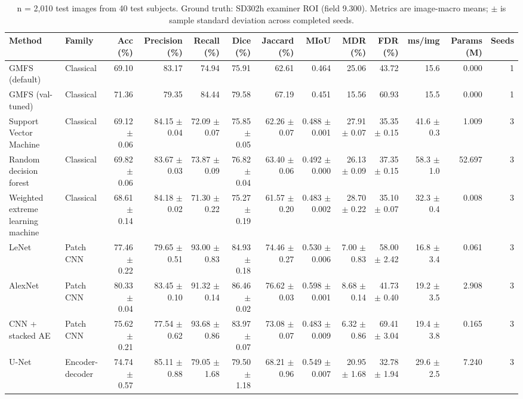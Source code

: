\begin{table}[t]
\centering
\scriptsize
\setlength{\tabcolsep}{3pt}
\caption{n = 2,010 test images from 40 test subjects. Ground truth: SD302h examiner ROI (field 9.300). Metrics are image-macro means; $\pm$ is sample standard deviation across completed seeds.}
\label{tab:sd302e-roi}
\begin{tabular}{llrrrrrrrrrrr}
\toprule
Method & Family & Acc (\%) & Precision (\%) & Recall (\%) & Dice (\%) & Jaccard (\%) & MIoU & MDR (\%) & FDR (\%) & ms/img & Params (M) & Seeds \\
\midrule
GMFS (default) & Classical & 69.10 & 83.17 & 74.94 & 75.91 & 62.61 & 0.464 & 25.06 & 43.72 & 15.6 & 0.000 & 1 \\
GMFS (val-tuned) & Classical & 71.36 & 79.35 & 84.44 & 79.58 & 67.19 & 0.451 & 15.56 & 60.93 & 15.5 & 0.000 & 1 \\
Support Vector Machine & Classical & 69.12 $\pm$ 0.06 & 84.15 $\pm$ 0.04 & 72.09 $\pm$ 0.07 & 75.85 $\pm$ 0.05 & 62.26 $\pm$ 0.07 & 0.488 $\pm$ 0.001 & 27.91 $\pm$ 0.07 & 35.35 $\pm$ 0.15 & 41.6 $\pm$ 0.3 & 1.009 & 3 \\
Random decision forest & Classical & 69.82 $\pm$ 0.06 & 83.67 $\pm$ 0.03 & 73.87 $\pm$ 0.09 & 76.82 $\pm$ 0.04 & 63.40 $\pm$ 0.06 & 0.492 $\pm$ 0.000 & 26.13 $\pm$ 0.09 & 37.35 $\pm$ 0.15 & 58.3 $\pm$ 1.0 & 52.697 & 3 \\
Weighted extreme learning machine & Classical & 68.61 $\pm$ 0.14 & 84.18 $\pm$ 0.02 & 71.30 $\pm$ 0.22 & 75.27 $\pm$ 0.19 & 61.57 $\pm$ 0.20 & 0.483 $\pm$ 0.002 & 28.70 $\pm$ 0.22 & 35.10 $\pm$ 0.07 & 32.3 $\pm$ 0.4 & 0.008 & 3 \\
LeNet & Patch CNN & 77.46 $\pm$ 0.22 & 79.65 $\pm$ 0.51 & 93.00 $\pm$ 0.83 & 84.93 $\pm$ 0.18 & 74.46 $\pm$ 0.27 & 0.530 $\pm$ 0.006 & 7.00 $\pm$ 0.83 & 58.00 $\pm$ 2.42 & 16.8 $\pm$ 3.4 & 0.061 & 3 \\
AlexNet & Patch CNN & 80.33 $\pm$ 0.04 & 83.45 $\pm$ 0.10 & 91.32 $\pm$ 0.14 & 86.46 $\pm$ 0.02 & 76.62 $\pm$ 0.03 & 0.598 $\pm$ 0.001 & 8.68 $\pm$ 0.14 & 41.73 $\pm$ 0.40 & 19.2 $\pm$ 3.5 & 2.908 & 3 \\
CNN + stacked AE & Patch CNN & 75.62 $\pm$ 0.21 & 77.54 $\pm$ 0.62 & 93.68 $\pm$ 0.86 & 83.97 $\pm$ 0.07 & 73.08 $\pm$ 0.07 & 0.483 $\pm$ 0.009 & 6.32 $\pm$ 0.86 & 69.41 $\pm$ 3.04 & 19.4 $\pm$ 3.8 & 0.165 & 3 \\
U-Net & Encoder-decoder & 74.74 $\pm$ 0.57 & 85.11 $\pm$ 0.88 & 79.05 $\pm$ 1.68 & 79.50 $\pm$ 1.18 & 68.21 $\pm$ 0.96 & 0.549 $\pm$ 0.007 & 20.95 $\pm$ 1.68 & 32.78 $\pm$ 1.94 & 29.6 $\pm$ 2.5 & 7.240 & 3 \\

\end{tabular}
\end{table}

